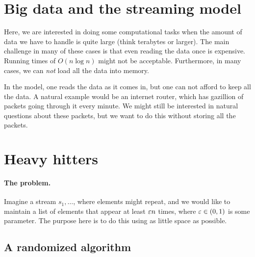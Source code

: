 
\section{Big data and the streaming model}

Here, we are interested in doing some computational tasks when the
amount of data we have to handle is quite large (think terabytes or
larger).  The main challenge in many of these cases is that even
reading the data once is expensive. Running times of $O(n \log n)$
might not be acceptable. Furthermore, in many cases, we can \emph{not}
load all the data into memory.

In the  model, one reads the data as it comes in, but
one can not afford to keep all the data. A natural example would be an
internet router, which has gazillion of packets going through it every
minute. We might still be interested in natural questions about these
packets, but we want to do this without storing all the packets.






\section{Heavy hitters}

\paragraph*{The problem.}
Imagine a stream $s_1,\ldots$, where elements might repeat, and we
would like to maintain a list of elements that appear at least
${\varepsilon} n$ times, where ${\varepsilon} \in (0,1)$ is some parameter. The purpose
here is to do this using as little space as possible.

\subsection{A randomized algorithm}


